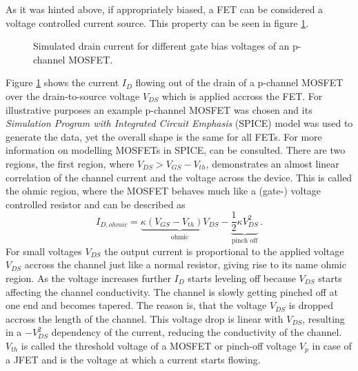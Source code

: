 As it was hinted above, if appropriately biased, a FET can be considered a voltage controlled current source. This property can be seen in figure \ref{fig:fet_curret_gate_bias}.

\begin{figure}[hb]
    \centering
    
    \caption{Simulated drain current for different gate bias voltages of an  p-channel MOSFET.}
    \label{fig:fet_curret_gate_bias}
\end{figure}

Figure \ref{fig:fet_curret_gate_bias} shows the current $I_D$ flowing out of the drain of a p-channel MOSFET over the drain-to-source voltage $V_{DS}$ which is applied accross the FET. For illustrative purposes an example p-channel MOSFET was chosen and its \textit{Simulation Program with Integrated Circuit Emphasis} (SPICE) model \cite{irf9610_spice,irf9610_spice_better} was used to generate the data, yet the overall shape is the same for all FETs. For more information on modelling MOSFETs in SPICE, \citep[p. 442]{spice_mosfets} can be consulted. There are two regions, the first region, where $V_{DS} > V_{GS} - V_{th}$, demonstrates an almost linear correlation of the channel current and the voltage across the device. This is called the ohmic region, where the MOSFET behaves much like a (gate-) voltage controlled resistor and can be described \cite{shockley_fet_equations} as
\begin{equation}
    I_{D,ohmic} = \underbrace{\kappa (V_{GS} - V_{th}) V_{DS}}_{\text{ohmic}} - \underbrace{\frac 1 2 \kappa V_{DS}^2}_{\text{pinch off}} \, .
\end{equation}
For small voltages $V_{DS}$ the output current is proportional to the applied voltage $V_{DS}$ accross the channel just like a normal resistor, giving rise to its name ohmic region. As the voltage increases further $I_D$ starts leveling off because $V_{DS}$ starts affecting the channel conductivity. The channel is slowly getting pinched off at one end and becomes tapered. The reason is, that the voltage $V_{DS}$ is dropped accross the length of the channel. This voltage drop is linear with $V_{DS}$, resulting in a $-V_{DS}^2$ dependency of the current, reducing the conductivity of the channel. $V_{th}$ is called the threshold voltage of a MOSFET or pinch-off voltage $V_p$ in case of a JFET and is the voltage at which a current starts flowing.


